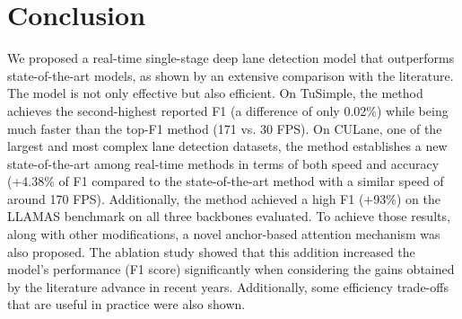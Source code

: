 \documentclass[final]{cvpr}
\begin{document}
\begin{table}
\begin{center}
\end{center}
\caption{Ablation study results on CULane.}
\label{tab:ablation-study}
\end{table} 
 \section{Conclusion}
We proposed a real-time single-stage deep lane detection model that outperforms state-of-the-art models, as shown by an extensive comparison with the literature. The model is not only effective but also efficient. On TuSimple, the method achieves the second-highest reported F1 (a difference of only 0.02\%) while being much faster than the top-F1 method (171 vs. 30 FPS). On CULane, one of the largest and most complex lane detection datasets, the method establishes a new state-of-the-art among real-time methods in terms of both speed and accuracy (+4.38\% of F1 compared to the state-of-the-art method with a similar speed of around 170 FPS). Additionally, the method achieved a high F1 (+93\%) on the LLAMAS benchmark on all three backbones evaluated. To achieve those results, along with other modifications, a novel anchor-based attention mechanism was also proposed. The ablation study showed that this addition increased the model's performance (F1 score) significantly when considering the gains obtained by the literature advance in recent years. Additionally, some efficiency trade-offs that are useful in practice were also shown.  
{\small


}
\end{document}
